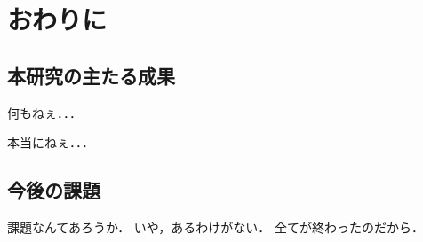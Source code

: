 
\chapter{おわりに}
\label{cha:conclu}

\section{本研究の主たる成果}
\label{sec:main-result}

何もねぇ．．．

本当にねぇ．．．

\section{今後の課題}
\label{sec:future}

課題なんてあろうか．
いや，あるわけがない．
全てが終わったのだから．


